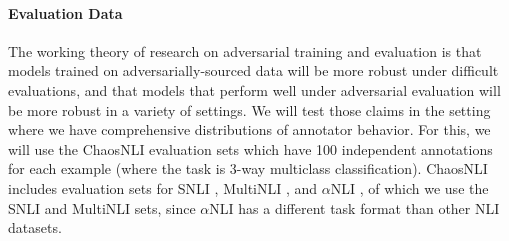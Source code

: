 \documentclass[10pt,a4paper]{article}
\begin{document}
\paragraph{Evaluation Data}
The working theory of research on adversarial training and evaluation is that models trained on
adversarially-sourced data will be more robust under difficult evaluations, and that models that
perform well under adversarial evaluation will be more robust in a variety of settings. We will test
those claims in the setting where we have comprehensive distributions of annotator behavior. For
this, we will use the ChaosNLI evaluation sets \citep{nie-bansal-2020-learn} which have 100
independent annotations for each example (where the task is 3-way multiclass classification).
ChaosNLI includes evaluation sets for SNLI \citep{bowman2015large}, MultiNLI
\citep{williams-etal-2018-broad}, and
$\alpha$NLI \citep[Abductive NLI]{bhagavatula-etal-2020-abductive}, of which we use the SNLI and MultiNLI sets, since $\alpha$NLI has a different task format than other NLI datasets.
\end{document}
